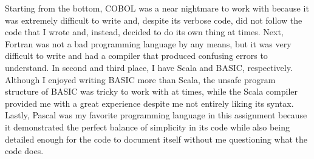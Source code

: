 \documentclass[letterpaper, 10pt, DIV=13]{scrartcl}
\numberwithin{equation}{section}
\numberwithin{figure}{section}
\numberwithin{table}{section}
\begin{document}
Starting from the bottom, COBOL was a near nightmare to work with because it was extremely difficult to write and, despite its verbose code, did not follow the code that I wrote and, instead, decided to do its own thing at times. Next, Fortran was not a bad programming language by any means, but it was very difficult to write and had a compiler that produced confusing errors to understand. In second and third place, I have Scala and BASIC, respectively. Although I enjoyed writing BASIC more than Scala, the unsafe program structure of BASIC was tricky to work with at times, while the Scala compiler provided me with a great experience despite me not entirely liking its syntax. Lastly, Pascal was my favorite programming language in this assignment because it demonstrated the perfect balance of simplicity in its code while also being detailed enough for the code to document itself without me questioning what the code does.
\end{document}
